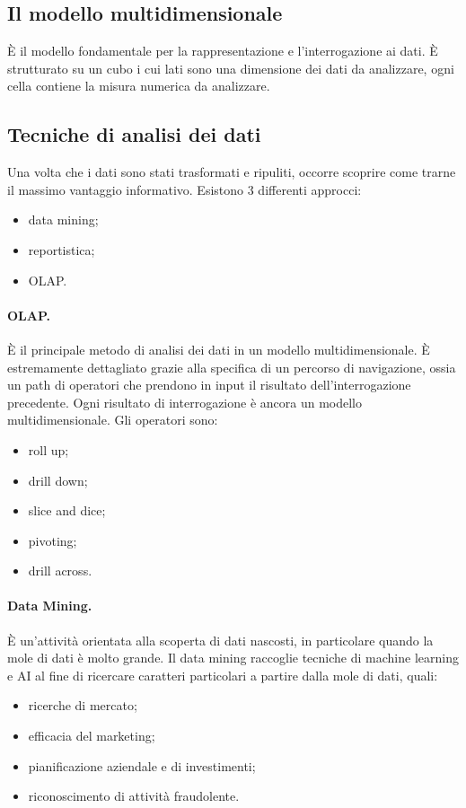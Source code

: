 \documentclass[a4paper, 10pt]{article}
\begin{document}
	\subsection{Il modello multidimensionale}
	È il modello fondamentale per la rappresentazione e l'interrogazione ai dati. È strutturato su un cubo i cui lati sono una dimensione dei dati da analizzare, ogni cella contiene la misura numerica da analizzare.
	
	\subsection{Tecniche di analisi dei dati}
	Una volta che i dati sono stati trasformati e ripuliti, occorre scoprire come trarne il massimo vantaggio informativo. Esistono 3 differenti approcci: \begin{itemize}
		\item data mining;
		\item reportistica;
		\item OLAP.
	\end{itemize}

	\paragraph{OLAP.} È il principale metodo di analisi dei dati in un modello multidimensionale. È estremamente dettagliato grazie alla specifica di un percorso di navigazione, ossia un path di operatori che prendono in input il risultato dell'interrogazione precedente. Ogni risultato di interrogazione è ancora un modello multidimensionale. Gli operatori sono: \begin{itemize}
		\item roll up;
		\item drill down;
		\item slice and dice;
		\item pivoting;
		\item drill across.
	\end{itemize}

	\paragraph{Data Mining.} È un'attività orientata alla scoperta di dati nascosti, in particolare quando la mole di dati è molto grande. Il data mining raccoglie tecniche di machine learning e AI al fine di ricercare caratteri particolari a partire dalla mole di dati, quali:\begin{itemize}
		\item ricerche di mercato;
		\item efficacia del marketing;
		\item pianificazione aziendale e di investimenti;
		\item riconoscimento di attività fraudolente.
	\end{itemize}
\end{document}
